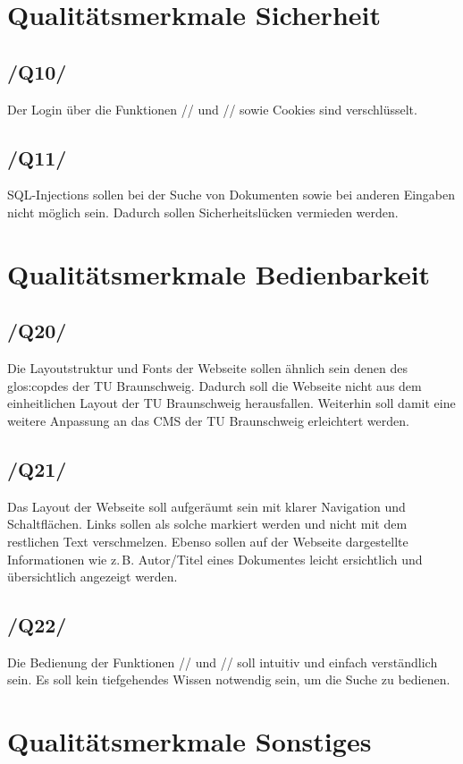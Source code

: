 \section{Qualitätsmerkmale Sicherheit}
\subsection{/Q10/} Der Login über die Funktionen // und // sowie Cookies sind verschlüsselt.
\subsection{/Q11/} SQL-Injections sollen bei der Suche von Dokumenten sowie bei anderen Eingaben nicht möglich sein. Dadurch sollen Sicherheitslücken vermieden werden.
\section{Qualitätsmerkmale Bedienbarkeit}
\subsection{/Q20/} Die Layoutstruktur und Fonts der Webseite sollen ähnlich sein denen des \Gls{glos:copdes} der TU Braunschweig. Dadurch soll die Webseite nicht aus dem einheitlichen Layout der TU Braunschweig herausfallen. Weiterhin soll damit eine weitere Anpassung an das CMS der TU Braunschweig erleichtert werden.
\subsection{/Q21/} Das Layout der Webseite soll aufgeräumt sein mit klarer Navigation und Schaltflächen. Links sollen als solche markiert werden und nicht mit dem restlichen Text verschmelzen. Ebenso sollen auf der Webseite dargestellte Informationen wie \mbox{z.\,B.}\xspace Autor/Titel eines Dokumentes leicht ersichtlich und übersichtlich angezeigt werden.
\subsection{/Q22/} Die Bedienung der Funktionen // und // soll intuitiv und einfach verständlich sein. Es soll kein tiefgehendes Wissen notwendig sein, um die Suche zu bedienen.
\section{Qualitätsmerkmale Sonstiges}
